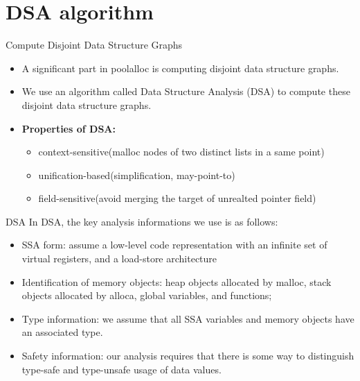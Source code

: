 \documentclass{beamer}
\begin{document}
\section{DSA algorithm}

\begin{frame}{Compute Disjoint Data Structure Graphs}
  \begin{itemize}
	  \setlength{\itemsep}{0.5cm}
	\item 
  A significant part in poolalloc is computing disjoint data structure graphs.\\
  \item We use an algorithm called Data Structure Analysis (DSA) to compute these disjoint data structure graphs.\\
\item	\textbf{
Properties of DSA:}
	\begin{itemize}
	  \item context-sensitive(malloc nodes of two distinct lists in a same point)\\
	  \item unification-based(simplification, may-point-to)\\
	  \item field-sensitive(avoid merging the target of unrealted pointer field)
	\end{itemize}
  \end{itemize}
\end{frame}

\begin{frame}{DSA}
  In DSA, the key analysis informations we use is as follows:
  \begin{itemize}
	\item SSA form: assume a low-level code representation with
an infinite set of virtual registers, and a load-store architecture
\item Identification of memory objects: heap objects allocated by malloc, stack objects allocated
by alloca, global variables, and functions;
\item Type information:  we assume that all SSA variables and
memory objects have an associated type.
\item Safety information: our analysis requires that there is
some way to distinguish type-safe and type-unsafe usage of
data values.
  \end{itemize}

\end{frame}
\end{document}
